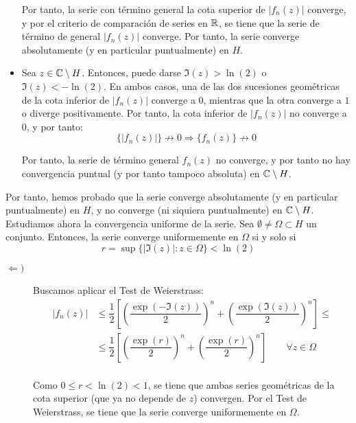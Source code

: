 \begin{ejercicio}
\begin{itemize}
        Por tanto, la serie con término general la cota superior de $|f_n(z)|$ converge, y por el criterio de comparación de series en $\mathbb{R}$, se tiene que la serie de término de general $|f_n(z)|$ converge. Por tanto, la serie converge absolutamente (y en particular puntualmente) en $H$.

        \item Sea $z\in \mathbb{C}\setminus H$. Entonces, puede darse $\Im(z) > \ln(2)$ o $\Im(z) < -\ln(2)$. En ambos casos, una de las dos sucesiones geométricas de la cota inferior de $|f_n(z)|$ converge a $0$, mientras que la otra converge a $1$ o diverge positivamente. Por tanto, la cota inferior de $|f_n(z)|$ no converge a $0$, y por tanto:
        \begin{equation*}
            \{|f_n(z)|\} \not\to 0 \Longrightarrow \{f_n(z)\}\not\to 0
        \end{equation*}

        Por tanto, la serie de término general $f_n(z)$ no converge, y por tanto no hay convergencia puntual (y por tanto tampoco absoluta) en $\mathbb{C}\setminus H$.
    \end{itemize}

    Por tanto, hemos probado que la serie converge absolutamente (y en particular puntualmente) en $H$, y no converge (ni siquiera puntualmente) en $\mathbb{C}\setminus H$.\\

    Estudiamos ahora la convergencia uniforme de la serie. Sea $\emptyset\neq \Omega \subset H$ un conjunto. Entonces, la serie converge uniformemente en $\Omega$ si y solo si
    \begin{equation*}
        r=\sup\{|\Im(z)| : z\in \Omega\} < \ln(2)
    \end{equation*}
    \begin{description}
        \item[$\Longleftarrow)$] Buscamos aplicar el Test de Weierstrass:
        \begin{align*}
            |f_n(z)| &\leq 
             \dfrac{1}{2}\left[\left(\dfrac{\exp(-\Im(z))}{2}\right)^{n}+\left(\dfrac{\exp(\Im(z))}{2}\right)^{n}\right]
            \leq\\&\leq \dfrac{1}{2}\left[\left(\dfrac{\exp(r)}{2}\right)^{n}+\left(\dfrac{\exp(r)}{2}\right)^{n}\right] \qquad \forall z\in \Omega\\
        \end{align*}

        Como $0\leq r<\ln(2)<1$, se tiene que ambas series geométricas de la cota superior (que ya no depende de $z$) convergen. Por el Test de Weierstrass, se tiene que la serie converge uniformemente en $\Omega$.


\end{description}
\end{ejercicio}

